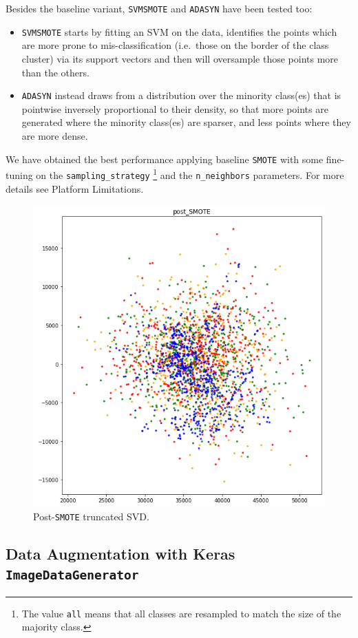 \documentclass[aps,twocolumn,secnumarabic,nobalancelastpage,amsmath,amssymb,
nofootinbib]{revtex4}
\begin{document}
Besides the baseline variant, \texttt{SVMSMOTE} and \texttt{ADASYN} have
been tested too:

\begin{itemize}
\item
\texttt{SVMSMOTE} starts by fitting an SVM on the data, identifies the
points which are more prone to mis-classification (i.e.~those on the
border of the class cluster) via its support vectors and then will
oversample those points more than the others.
\vspace{-0.2cm}\item
\texttt{ADASYN} instead draws from a distribution over the minority
class(es) that is pointwise inversely proportional to their density,
so that more points are generated where the minority class(es) are
sparser, and less points where they are more dense.
\end{itemize}

We have obtained the best performance applying baseline \texttt{SMOTE}
with some fine-tuning on the \texttt{sampling\_strategy} \footnote{The
value \texttt{all} means that all classes are resampled to match the
size of the majority class.} and the \texttt{n\_neighbors} parameters.
For more details see Platform
	Limitations.

\begin{figure}[h]
	\centering
	\includegraphics[width=0.7\linewidth]{Images/TruncatedSVD_postSMOTE}
	\caption{Post-\texttt{SMOTE} truncated SVD.}\label{fig:post-smote}
\end{figure}

\subsection{Data Augmentation with Keras
		\texttt{ImageDataGenerator}\label{data-generator}}
\end{document}
